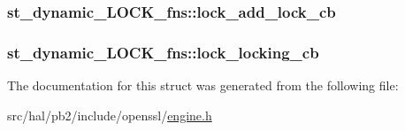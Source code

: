 \subsubsection[{\texorpdfstring{lock\+\_\+add\+\_\+lock\+\_\+cb}{lock_add_lock_cb}}]{ st\+\_\+dynamic\+\_\+\+L\+O\+C\+K\+\_\+fns\+::lock\+\_\+add\+\_\+lock\+\_\+cb}\hypertarget{structst__dynamic___l_o_c_k__fns_aa7178025f352542e04bb37fd3be59396}{}\label{structst__dynamic___l_o_c_k__fns_aa7178025f352542e04bb37fd3be59396}
\subsubsection[{\texorpdfstring{lock\+\_\+locking\+\_\+cb}{lock_locking_cb}}]{ st\+\_\+dynamic\+\_\+\+L\+O\+C\+K\+\_\+fns\+::lock\+\_\+locking\+\_\+cb}\hypertarget{structst__dynamic___l_o_c_k__fns_a495ddb05b36eee18ce44ed977c6f6d8d}{}\label{structst__dynamic___l_o_c_k__fns_a495ddb05b36eee18ce44ed977c6f6d8d}


The documentation for this struct was generated from the following file\+:\begin{DoxyCompactItemize}
\item 
src/hal/pb2/include/openssl/\hyperlink{engine_8h}{engine.\+h}\end{DoxyCompactItemize}

